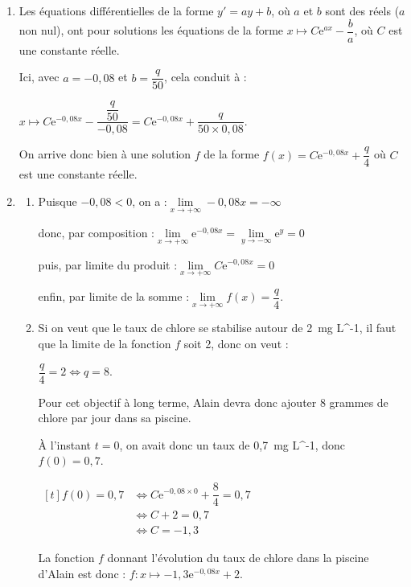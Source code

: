 \documentclass[10pt]{article}
\providecommand{\e}{{\mathrm{e}}}
\providecommand{\np}[2][]{{#2~#1}}
\begin{document}
\begin{enumerate}
\item Les équations différentielles de la forme \quad$y' = ay + b$, où $a$ et $b$ sont des réels ($a$ non nul), ont pour solutions les équations de la forme \quad $x\longmapsto C\e^{ax} - \dfrac{b}{a}$, où $C$ est une constante réelle.

Ici, avec $a = -0,08$ et $b = \dfrac{q}{50}$, cela conduit à :

$x\longmapsto C\e^{-0,08x} - \dfrac{\dfrac{q}{50}}{-0,08} = C\e^{-0,08x} + \dfrac{q}{50\times 0,08}$.

On arrive donc bien à une solution $f$ de la forme $f(x)=C \e^{-0,08 x}+\dfrac{q}{4}$ où $C$ est une constante réelle.

\item
	\begin{enumerate}
		\item Puisque $-0,08<0$, on a :\quad $\lim\limits_{x \to +\infty}-0,08x = -\infty$

donc, par composition :\quad $\lim\limits_{x \to +\infty}\e^{-0,08x} = \lim\limits_{y \to -\infty} \e^y = 0$

puis, par limite du produit :\quad $ \lim\limits_{x \to +\infty}C\e^{-0,08x} = 0$

enfin, par limite de la somme :\quad $\lim\limits_{x \to +\infty}f(x) = \dfrac{q}{4}$.

		\item Si on veut que le taux de chlore se stabilise autour de \np[mg \cdot L^{-1}]{2}, il faut que la limite de la fonction $f$ soit 2, donc on veut :

$\dfrac{q}{4} = 2 \iff q = 8$.

Pour cet objectif à long terme, Alain devra donc ajouter 8 grammes de chlore par jour dans sa piscine.

À l'instant $t = 0$, on avait donc un	taux de \np[mg \cdot L^{-1}]{0,7}, donc $f(0) = 0,7$.

$\begin{aligned}[t] f(0) = 0,7 &\iff C\e^{-0,08\times 0} + \dfrac{8}{4} =0,7\\
&\iff C + 2 = 0,7\\
&\iff C = -1,3\end{aligned}$

La fonction $f$ donnant l'évolution du taux de chlore dans la piscine d'Alain est donc :
\quad$f :x \longmapsto -1,3\e^{-0,08x} + 2$.
	\end{enumerate}
\end{enumerate}

\medskip
\end{document}
